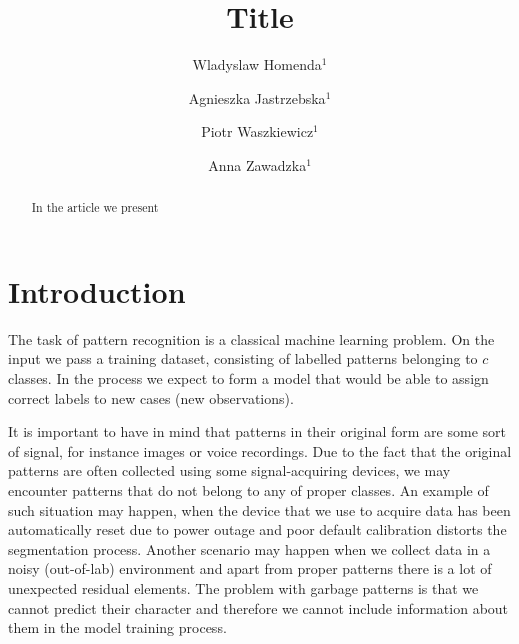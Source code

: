 \documentclass{llncs}
\begin{document}
\title{Title}
\author{Wladyslaw Homenda$^{1}$
\and Agnieszka Jastrzebska$^1$
\and Piotr Waszkiewicz$^1$
\and Anna Zawadzka$^1$
}


\maketitle

\pagestyle{empty}  %

\begin{abstract}
In the article we present
\end{abstract}



\section{Introduction}
  \label{sec:Introduction}

The task of pattern recognition is a classical machine learning problem. On the input we pass a training dataset, consisting of labelled patterns belonging to $c$ classes. In the process we expect to form a model that would be able to assign correct labels to new cases (new observations).

It is important to have in mind that patterns in their original form are some sort of signal, for instance images or voice recordings. Due to the fact that the original patterns are often collected using some signal-acquiring devices, we may encounter patterns that do not belong to any of proper classes. An example of such situation may happen, when the device that we use to acquire data has been automatically reset due to power outage and poor default calibration distorts the segmentation process. Another scenario may happen when we collect data in a noisy (out-of-lab) environment and apart from proper patterns there is a lot of unexpected residual elements. The problem with garbage patterns is that we cannot predict their character and therefore we cannot include information about them in the model training process.
\end{document}
